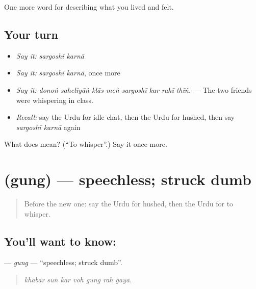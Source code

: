 \begin{grammarlens}[title={What you've built}]
One more word for describing what you lived and felt.
\end{grammarlens}

\subsection*{Your turn}
\begin{itemize}
\raggedright
  \item \emph{Say it:} \emph{sargoshī karnā}
  \item \emph{Say it:} \emph{sargoshī karnā}, once more
  \item \emph{Say it:} \emph{donoṅ saheliyāṅ klās meṅ sargoshī kar rahī thīṅ.} — The two friends were whispering in class.
  \item \emph{Recall:} say the Urdu for idle chat, then the Urdu for hushed, then say \emph{sargoshī karnā} again
\end{itemize}

\begin{tcolorbox}[breakable,colback=teal!4,colframe=teal!35!black,title={Before you move on}]
What does   mean? (\textquotedblleft{}To whisper\textquotedblright{}.) Say it once more.
\end{tcolorbox}
\section[\texorpdfstring{\ur{گنگ} (gung)}{گنگ (gung)}]{ (gung) — speechless; struck dumb}

\label{lesson:UR-C463-gung}



\begin{quote}
Before the new one: say the Urdu for hushed, then the Urdu for to whisper.
\end{quote}

\subsection*{You'll want to know: }
\textbf{} — \emph{gung} — \textquotedblleft{}speechless; struck dumb\textquotedblright{}.

\begin{quote}
      
\end{quote}

\begin{quote}
\emph{khabar sun kar voh gung rah gayā.}
\end{quote}

